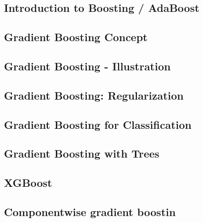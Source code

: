 




\subsection{Introduction to Boosting / AdaBoost}


\subsection{Gradient Boosting Concept}


\subsection{Gradient Boosting - Illustration}


\subsection{Gradient Boosting: Regularization}


\subsection{Gradient Boosting for Classification}


\subsection{Gradient Boosting with Trees}


\subsection{XGBoost}


\subsection{Componentwise gradient boostin}










